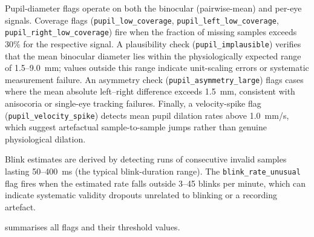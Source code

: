 Pupil-diameter flags operate on both the binocular (pairwise-mean)
and per-eye signals.
Coverage flags (\texttt{pupil\_low\_coverage},
\texttt{pupil\_left\_low\_coverage}, \texttt{pupil\_right\_low\_coverage})
fire when the fraction of missing samples exceeds 30\% for the respective
signal.
A plausibility check (\texttt{pupil\_implausible}) verifies that the mean
binocular diameter lies within the physiologically expected range of
1.5--9.0~mm; values outside this range indicate unit-scaling errors or
systematic measurement failure.
An asymmetry check (\texttt{pupil\_asymmetry\_large}) flags cases where the
mean absolute left--right difference exceeds 1.5~mm, consistent with
anisocoria or single-eye tracking failures.
Finally, a velocity-spike flag (\texttt{pupil\_velocity\_spike}) detects
mean pupil dilation rates above 1.0~mm/s, which suggest artefactual
sample-to-sample jumps rather than genuine physiological dilation.

Blink estimates are derived by detecting runs of consecutive invalid samples
lasting 50--400~ms (the typical blink-duration range).
The \texttt{blink\_rate\_unusual} flag fires when the estimated rate falls
outside 3--45 blinks per minute, which can indicate systematic validity
dropouts unrelated to blinking or a recording artefact.

 summarises all flags and their threshold values.

